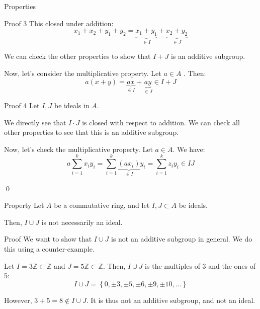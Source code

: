 \documentclass[a4paper]{article}
\begin{document}
\begin{parag}{Properties}
\begin{subparag}{Proof 3}
        This closed under addition: 
        \[x_1 + x_2 + y_1 + y_2 = \underbrace{x_1 + y_1}_{\in I} + \underbrace{x_2 + y_2}_{\in J}\]

        We can check the other properties to show that $I + J$ is an additive subgroup.

        Now, let's consider the multiplicative property. Let $a \in A$ . Then: 
        \[a\left(x + y\right) = \underbrace{ax}_{\in I} + \underbrace{ay}_{\in J} \in I + J\]
    \end{subparag}

    \begin{subparag}{Proof 4}
        Let $I, J$ be ideals in $A$.

        We directly see that $I\cdot J$ is closed with respect to addition. We can check all other properties to see that this is an additive subgroup.

        Now, let's check the multiplicative property. Let $a \in A$. We have: 
        \[a \sum_{i=1}^{k} x_i y_i = \sum_{i=1}^{k} \underbrace{\left(a x_i\right)}_{\in I}y_i = \sum_{i=1}^{k} z_i y_i \in I J\]
        
        \qed
    \end{subparag}
\end{parag}

\begin{parag}{Property}
    Let $A$ be a commutative ring, and let $I, J \subset A$ be ideals.

    Then, $I \cup J$ is not necessarily an ideal.

    \begin{subparag}{Proof}
        We want to show that $I \cup J$ is not an additive subgroup in general. We do this using a counter-example.

        Let $I = 3\mathbb{Z} \subset \mathbb{Z}$ and $J = 5\mathbb{Z} \subset \mathbb{Z}$. Then, $I \cup J$ is the multiples of 3 and the ones of 5: 
        \[I \cup J = \left\{0, \pm 3, \pm 5, \pm 6, \pm 9, \pm 10, \ldots\right\}\]
        
        However, $3 + 5 = 8 \not \in I \cup J$. It is thus not an additive subgroup, and not an ideal.
    \end{subparag}
\end{parag}
\end{document}
